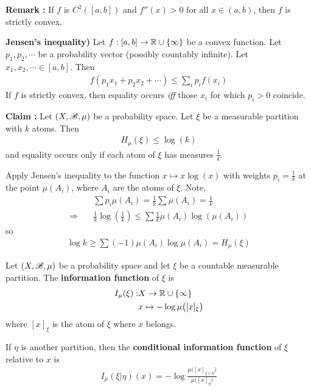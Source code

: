 \documentclass[12pt,a4paper]{report}
\newenvironment{proof}
{\begin{changemargin}{1cm}{0.5cm} 
	}%
	{\end{changemargin}
}
\begin{document}
\textbf{Remark :} If $f$ is $C^2([a,b])$ and $f''(x) >0$ for all $x\in (a,b)$, then $f$ is strictly convex.
\s

\textbf{Jensen's inequality)} Let $f:[a,b] \rightarrow \mathbb{R} \cup \{\infty\}$ be a convex function. Let $p_1, p_2, \cdots$ be a probability vector (possibly countably infinite). Let $x_1, x_2, \cdots \in [a,b]$. Then
\begin{align*}
f(p_1 x_1 + p_2 x_2 + \cdots) \leq \sum_i p_i f(x_i)
\end{align*}
If $f$ is strictly convex, then equality occurs \emph{iff} those $x_i$ for which $p_i >0$ coincide.
\s

\textbf{Claim :} Let $(X,\mathscr{B}, \mu)$ be a probability space. Let $\xi$ be a measurable partition with $k$ atoms. Then
\begin{align*}
H_{\mu}(\xi) \leq \log (k)
\end{align*}
and equality occurs only if each atom of $\xi$ has measures $\frac{1}{k}$.
\begin{proof}
\pf Apply Jensen's inequality to the function $x\mapsto x \log (x)$ with weights $p_i = \frac{1}{k}$ at the point $\mu(A_i)$, where $A_i$ are the atoms of $\xi$. Note,
\begin{align*}
& \sum p_i \mu(A_i) = \frac{1}{k} \sum \mu(A_i) = \frac{1}{k} \\
\Rightarrow \quad & \frac{1}{k} \log (\frac{1}{k}) \leq \sum \frac{1}{k} \mu(A_i) \log (\mu(A_i))
\end{align*}
so
\begin{align*}
\log k \geq \sum (-1) \mu(A_i) \log \mu(A_i) = H_{\mu}(\xi)
\end{align*}

\eop
\end{proof}

\s

 Let $(X, \mathscr{B}, \mu)$ be a probability space and let $\xi$ be a countable measurable partition. The \textbf{information function} of $\xi$ is
\begin{align*}
I_{\mu} (\xi) : & X \rightarrow \mathbb{R} \cup \{\infty \} \\
& x\mapsto -\log \mu \big( [x]_{\xi} \big)
\end{align*}
where $[x]_{\xi}$ is the atom of $\xi$ where $x$ belongs.

\quad If $\eta$ is another partition, then the \textbf{conditional information function} of $\xi$ relative to $x$ is
\begin{align*}
I_{\mu} (\xi | \eta) (x)  = - \log \frac{\mu \big( [x]_{\xi \vee \eta} \big)}{\mu \big( [x]_{\eta} \big)}
\end{align*}
\s
\end{document}
